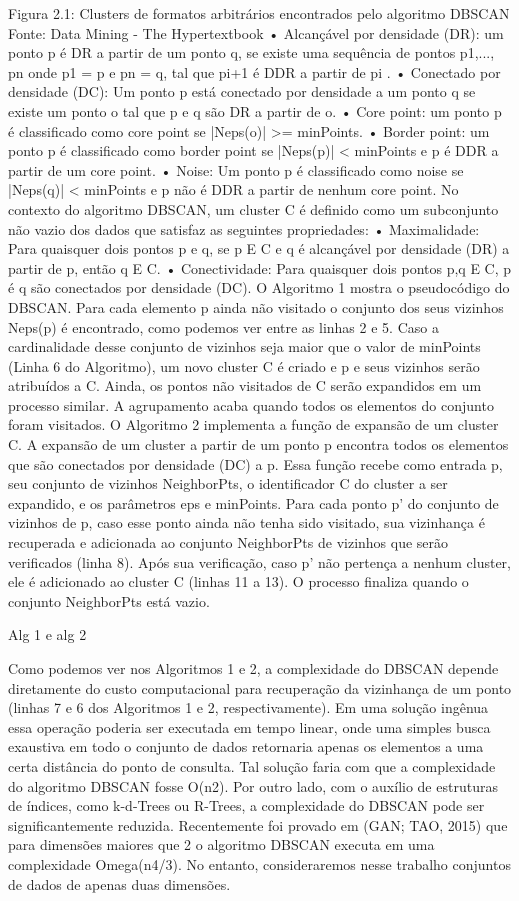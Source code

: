 Figura 2.1: Clusters de formatos arbitrários encontrados pelo algoritmo DBSCAN
Fonte: Data Mining - The Hypertextbook
• Alcançável por densidade (DR): um ponto p é DR a partir de um ponto q, se existe uma
sequência de pontos {p1,..., pn} onde p1 = p e pn = q, tal que pi+1 é DDR a partir de pi
.
• Conectado por densidade (DC): Um ponto p está conectado por densidade a um ponto q
se existe um ponto o tal que p e q são DR a partir de o.
• Core point: um ponto p é classificado como core point se |Neps(o)| >= minPoints.
• Border point: um ponto p é classificado como border point se |Neps(p)| < minPoints e p
é DDR a partir de um core point.
• Noise: Um ponto p é classificado como noise se |Neps(q)| < minPoints e p não é DDR a
partir de nenhum core point.
No contexto do algoritmo DBSCAN, um cluster C é definido como um subconjunto
não vazio dos dados que satisfaz as seguintes propriedades:
• Maximalidade: Para quaisquer dois pontos p e q, se p E C e q é alcançável por densidade
(DR) a partir de p, então q E C.
• Conectividade: Para quaisquer dois pontos p,q E C, p é q são conectados por densidade
(DC).
O Algoritmo 1 mostra o pseudocódigo do DBSCAN. Para cada elemento p ainda
não visitado o conjunto dos seus vizinhos Neps(p) é encontrado, como podemos ver entre as linhas
2 e 5. Caso a cardinalidade desse conjunto de vizinhos seja maior que o valor de minPoints
(Linha 6 do Algoritmo), um novo cluster C é criado e p e seus vizinhos serão atribuídos a C.
Ainda, os pontos não visitados de C serão expandidos em um processo similar. A agrupamento
acaba quando todos os elementos do conjunto foram visitados.
O Algoritmo 2 implementa a função de expansão de um cluster C. A expansão
de um cluster a partir de um ponto p encontra todos os elementos que são conectados por
densidade (DC) a p. Essa função recebe como entrada p, seu conjunto de vizinhos NeighborPts,
o identificador C do cluster a ser expandido, e os parâmetros eps e minPoints. Para cada ponto
p' do conjunto de vizinhos de p, caso esse ponto ainda não tenha sido visitado, sua vizinhança
é recuperada e adicionada ao conjunto NeighborPts de vizinhos que serão verificados (linha
8). Após sua verificação, caso p' não pertença a nenhum cluster, ele é adicionado ao cluster C
(linhas 11 a 13). O processo finaliza quando o conjunto NeighborPts está vazio.

Alg 1 e alg 2

Como podemos ver nos Algoritmos 1 e 2, a complexidade do DBSCAN depende
diretamente do custo computacional para recuperação da vizinhança de um ponto (linhas 7 e
6 dos Algoritmos 1 e 2, respectivamente). Em uma solução ingênua essa operação poderia ser
executada em tempo linear, onde uma simples busca exaustiva em todo o conjunto de dados
retornaria apenas os elementos a uma certa distância do ponto de consulta. Tal solução faria
com que a complexidade do algoritmo DBSCAN fosse O(n2). Por outro lado, com o auxílio
de estruturas de índices, como k-d-Trees ou R-Trees, a complexidade do DBSCAN pode ser
significantemente reduzida. Recentemente foi provado em (GAN; TAO, 2015) que para dimensões
maiores que 2 o algoritmo DBSCAN executa em uma complexidade Omega(n4/3). No entanto,
consideraremos nesse trabalho conjuntos de dados de apenas duas dimensões.



